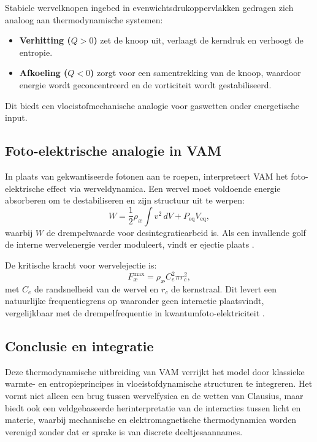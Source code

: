 Stabiele wervelknopen ingebed in evenwichtsdrukoppervlakken gedragen zich analoog aan thermodynamische systemen:
\begin{itemize}
\item \textbf{Verhitting ($Q > 0$)} zet de knoop uit, verlaagt de kerndruk en verhoogt de entropie. \item \textbf{Afkoeling ($Q < 0$)} zorgt voor een samentrekking van de knoop, waardoor energie wordt geconcentreerd en de vorticiteit wordt gestabiliseerd.
\end{itemize}
Dit biedt een vloeistofmechanische analogie voor gaswetten onder energetische input.

\subsection{Foto-elektrische analogie in VAM}

In plaats van gekwantiseerde fotonen aan te roepen, interpreteert VAM het foto-elektrische effect via werveldynamica. Een wervel moet voldoende energie absorberen om te destabiliseren en zijn structuur uit te werpen:
\begin{equation}
W = \frac{1}{2} \rho_\text{\ae} \int v^2 \, dV + P_\text{eq} V_\text{eq},\label{eq:foto-elektrische_arbeid}
\end{equation}
waarbij $W$ de drempelwaarde voor desintegratiearbeid is. Als een invallende golf de interne wervelenergie verder moduleert, vindt er ejectie plaats \cite{vam2025unified}.

De kritische kracht voor wervelejectie is:
\begin{equation}
F^{\text{max}}_{\text{\ae}} = \rho_\text{\ae} C_e^2 \pi r_c^2,\label{eq:critical_force}
\end{equation}
met $C_e$ de randsnelheid van de wervel en $r_c$ de kernstraal. Dit levert een natuurlijke frequentiegrens op waaronder geen interactie plaatsvindt, vergelijkbaar met de drempelfrequentie in kwantumfoto-elektriciteit \cite{einstein1905photoelectric}.

\subsection*{Conclusie en integratie}

Deze thermodynamische uitbreiding van VAM verrijkt het model door klassieke warmte- en entropieprincipes in vloeistofdynamische structuren te integreren. Het vormt niet alleen een brug tussen wervelfysica en de wetten van Clausius, maar biedt ook een veldgebaseerde herinterpretatie van de interacties tussen licht en materie, waarbij mechanische en elektromagnetische thermodynamica worden verenigd zonder dat er sprake is van discrete deeltjesaannames.
